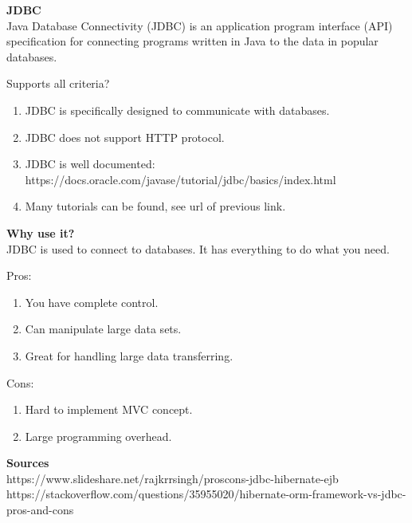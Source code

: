 		\textbf{JDBC} \\
		Java Database Connectivity (JDBC) is an application program interface (API) specification for connecting programs written in Java to the data in popular databases.
		
		Supports all criteria? \\
		\begin{enumerate}
			\item JDBC is specifically designed to communicate with databases.
			\item JDBC does not support HTTP protocol.
			\item JDBC is well documented: https://docs.oracle.com/javase/tutorial/jdbc/basics/index.html
			\item Many tutorials can be found, see url of previous link.
		\end{enumerate}
		
		\textbf{Why use it?} \\
		JDBC is used to connect to databases. It has everything to do what you need.
		
		Pros:
		\begin{enumerate}
			\item You have complete control.
			\item Can manipulate large data sets.
			\item Great for handling large data transferring.
		\end{enumerate}
		Cons:
		\begin{enumerate}
			\item Hard to implement MVC concept.
			\item Large programming overhead.
		\end{enumerate}
	
	\textbf{Sources}\\
	https://www.slideshare.net/rajkrrsingh/proscons-jdbc-hibernate-ejb \\
	https://stackoverflow.com/questions/35955020/hibernate-orm-framework-vs-jdbc-pros-and-cons \\